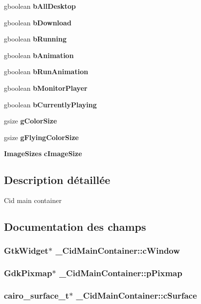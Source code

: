 \begin{CompactItemize}
\item 
gboolean {\bf bAllDesktop}
\item 
gboolean {\bf bDownload}
\item 
gboolean {\bf bRunning}
\item 
gboolean {\bf bAnimation}
\item 
gboolean {\bf bRunAnimation}
\item 
gboolean {\bf bMonitorPlayer}
\item 
gboolean {\bf bCurrentlyPlaying}
\item 
gsize {\bf gColorSize}
\item 
gsize {\bf gFlyingColorSize}
\item 
{\bf ImageSizes} {\bf cImageSize}
\end{CompactItemize}


\subsection{Description détaillée}
Cid main container 

\subsection{Documentation des champs}
\subsubsection{\setlength{\rightskip}{0pt plus 5cm}GtkWidget$\ast$ {\bf \_\-CidMainContainer::cWindow}}\label{struct__CidMainContainer_7b8b23945b2dd37b7d9183f983a162bb}


\subsubsection{\setlength{\rightskip}{0pt plus 5cm}GdkPixmap$\ast$ {\bf \_\-CidMainContainer::pPixmap}}\label{struct__CidMainContainer_74e5a84c9a85dba2c49cd138d5aba10d}


\subsubsection{\setlength{\rightskip}{0pt plus 5cm}cairo\_\-surface\_\-t$\ast$ {\bf \_\-CidMainContainer::cSurface}}\label{struct__CidMainContainer_136507962185b80a266bb2861a6785a6}



